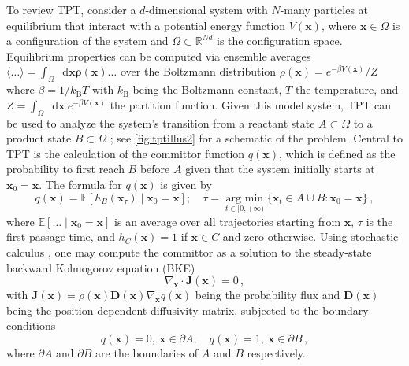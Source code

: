 \documentclass{article}
\numberwithin{equation}{section}
\def\*#1{\mathbf{#1}}
\newcommand*\diff{\mathop{}\!\mathrm{d}}
\theoremstyle{definition}
\theoremstyle{remark}
\def\avgE{\mathbb{E}}
\DeclareRobustCommand{\argmin}{\operatorname*{arg \ min}}
\begin{document}
To review TPT, consider a $d$-dimensional system with $N$-many particles at equilibrium that interact with a potential energy function $V(\* x)$, where $\* x \in \Omega $ is a configuration of the system and $\Omega \subset \mathbb{R}^{Nd}$ is the configuration space. 
Equilibrium properties can be computed via ensemble averages $\langle \ldots \rangle =  \int_\Omega \diff \* x \* \rho(\* x) \ldots$ over the Boltzmann distribution $\rho(\* x) = e^{-\beta V( \* x)}/Z$ where $\beta = 1/k_\mathrm{B} T$ with $k_\mathrm{B}$ being the Boltzmann constant, $T$ the temperature, and $Z = \int_\Omega \diff \* x \ e^{-\beta V(\* x)}$ the partition function. 
Given this model system, TPT can be used to analyze the system's transition from a reactant state $A \subset \Omega$ to a product state $B \subset \Omega$ \cite{weinan2006towards,vanden2010transition,berezhkovskii2013diffusion}; see \cref{fig:tptillus2} for a schematic of the problem. 
Central to TPT is the calculation of the  committor function $q(\* x)$, which is defined as the probability to first reach $B$ before $A$ given that the system initially starts at $\* x_0=\* x$. 
The formula for $q(\* x)$ is given by
\begin{equation}
    q(\* x) = \avgE \left[h_{B}\left(\* x_{\tau}\right) \mid \* x_0 = \* x \right]; \quad \tau = \argmin_{t \in [0,+\infty)} \{\* x_t \in A \cup B : \* x_0 = \* x \} \,, \label{eq:forwardqdef}
\end{equation}
where $ \avgE [ \ldots \mid   \* x_0 = \* x]$ is an average over all trajectories starting from $\* x$, $\tau$ is the first-passage time, and $h_C(\* x)=1$ if $\* x \in C$ and zero otherwise. 
Using stochastic calculus \cite{durrett1996stochastic}, one may compute the committor as a solution to the steady-state backward Kolmogorov equation (BKE)
\begin{equation}
    \nabla_{\* x} \cdot \* J(\* x) = 0 \,,  \label{eq:bke}  
\end{equation}
with $\* J(\* x) = \rho (\* x) \* D ( \* x ) \nabla_{\* x} q(\* x)$ being the probability flux and $\* D (\* x) $ being the position-dependent diffusivity matrix, subjected to the boundary conditions
\begin{equation}
    q(\* x) = 0, \ \* x \in \partial A; \quad q(\* x) = 1, \ \* x \in  \partial B \label{eq:bkebc} \,,
\end{equation}
where $\partial A$ and $\partial B$ are the boundaries of $A$ and $B$ respectively. 
\end{document}
